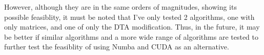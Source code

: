 \documentclass[12pt]{article}
\begin{document}
However, although they are in the same orders of magnitudes, showing its possible feasiblity, it must be noted that I've only tested 2 algorithms, one with only matrices, and one of only the DTA modification. Thus, in the future, it may be better if similar algorithms and a more wide range of algorithms are tested to further test the feasiblity of using Numba and CUDA as an alternative.


\pagebreak
\printbibliography
\end{document}
